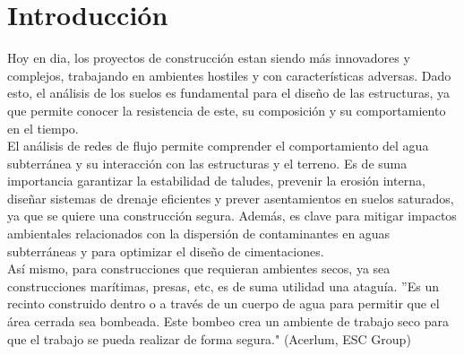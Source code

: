 \documentclass{article} %
\begin{document}
\newpage
\tableofcontents
\thispagestyle{plain} %
\thispagestyle{empty} %
\newpage

\setcounter{page}{1} %
\section{Introducción}

Hoy en dia, los proyectos de construcción estan siendo más innovadores
y complejos, trabajando en ambientes hostiles y con características adversas.
Dado esto, el análisis de los suelos es fundamental para el diseño de las
estructuras, ya que permite conocer la resistencia de este, su composición y su
comportamiento en el tiempo.\\

El análisis de redes de flujo permite comprender el comportamiento 
del agua subterránea y su interacción con las estructuras y el terreno.
Es de suma importancia garantizar la estabilidad de taludes, prevenir la 
erosión interna, diseñar sistemas de drenaje eficientes y prever asentamientos 
en suelos saturados, ya que se quiere una construcción segura. Además, es clave 
para mitigar impactos ambientales relacionados con la dispersión de 
contaminantes en aguas subterráneas y para optimizar el diseño de cimentaciones.\\

Así mismo, para construcciones que requieran ambientes secos, ya sea construcciones marítimas, presas, etc, 
es de suma utilidad una ataguía. ''Es un recinto construido dentro o a través de un cuerpo de agua para permitir 
que el área cerrada sea bombeada. Este bombeo crea un ambiente de trabajo seco para que el trabajo se pueda 
realizar de forma segura." (Acerlum, ESC Group)\\
\end{document}
